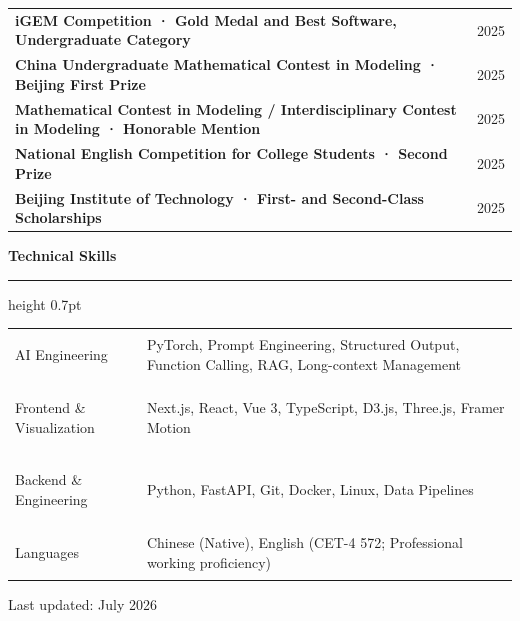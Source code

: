 \documentclass[10pt,a4paper]{article}
\newcommand{\cvsection}[1]{%
  \vspace{0.72em}
  {\large\bfseries\color{Ink} #1}\par
  \vspace{0.22em}
  {\color{Rule}\hrule height 0.7pt}
  \vspace{0.36em}
}
\begin{document}
\begin{tabularx}{\textwidth}{@{}>{\bfseries}Xr@{}}
  iGEM Competition · Gold Medal and Best Software, Undergraduate Category & 2025 \\
  China Undergraduate Mathematical Contest in Modeling · Beijing First Prize & 2025 \\
  Mathematical Contest in Modeling / Interdisciplinary Contest in Modeling · Honorable Mention & 2025 \\
  National English Competition for College Students · Second Prize & 2025 \\
  Beijing Institute of Technology · First- and Second-Class Scholarships & 2025
\end{tabularx}

\cvsection{Technical Skills}

\begin{tabularx}{\textwidth}{@{}>{\bfseries\raggedright\arraybackslash}p{5.2cm}@{\hspace{0.35cm}}>{\raggedright\arraybackslash}X@{}}
  AI Engineering & PyTorch, Prompt Engineering, Structured Output, Function Calling, RAG, Long-context Management \\
  Frontend \& Visualization & Next.js, React, Vue 3, TypeScript, D3.js, Three.js, Framer Motion \\
  Backend \& Engineering & Python, FastAPI, Git, Docker, Linux, Data Pipelines \\
  Languages & Chinese (Native), English (CET-4 572; Professional working proficiency)
\end{tabularx}

\vfill
{\footnotesize\color{Muted}Last updated: July 2026}
\end{document}
